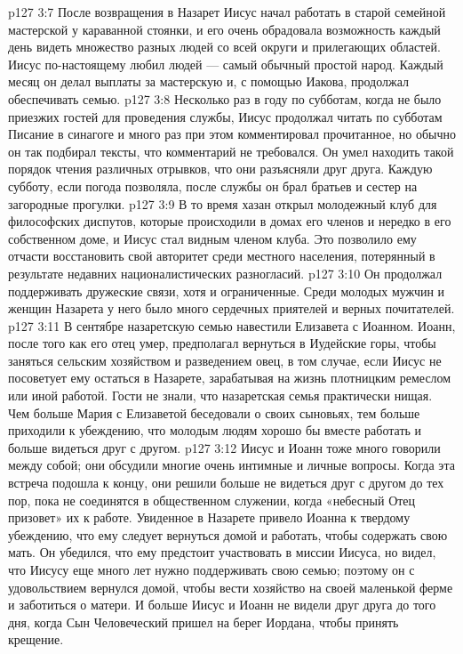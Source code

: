 \vs p127 3:7 \pc После возвращения в Назарет Иисус начал работать в старой семейной мастерской у караванной стоянки, и его очень обрадовала возможность каждый день видеть множество разных людей со всей округи и прилегающих областей. Иисус по\hyp{}настоящему любил людей --- самый обычный простой народ. Каждый месяц он делал выплаты за мастерскую и, с помощью Иакова, продолжал обеспечивать семью.
\vs p127 3:8 Несколько раз в году по субботам, когда не было приезжих гостей для проведения службы, Иисус продолжал читать по субботам Писание в синагоге и много раз при этом комментировал прочитанное, но обычно он так подбирал тексты, что комментарий не требовался. Он умел находить такой порядок чтения различных отрывков, что они разъясняли друг друга. Каждую субботу, если погода позволяла, после службы он брал братьев и сестер на загородные прогулки.
\vs p127 3:9 В то время хазан открыл молодежный клуб для философских диспутов, которые происходили в домах его членов и нередко в его собственном доме, и Иисус стал видным членом клуба. Это позволило ему отчасти восстановить свой авторитет среди местного населения, потерянный в результате недавних националистических разногласий.
\vs p127 3:10 Он продолжал поддерживать дружеские связи, хотя и ограниченные. Среди молодых мужчин и женщин Назарета у него было много сердечных приятелей и верных почитателей.
\vs p127 3:11 \pc В сентябре назаретскую семью навестили Елизавета с Иоанном. Иоанн, после того как его отец умер, предполагал вернуться в Иудейские горы, чтобы заняться сельским хозяйством и разведением овец, в том случае, если Иисус не посоветует ему остаться в Назарете, зарабатывая на жизнь плотницким ремеслом или иной работой. Гости не знали, что назаретская семья практически нищая. Чем больше Мария с Елизаветой беседовали о своих сыновьях, тем больше приходили к убеждению, что молодым людям хорошо бы вместе работать и больше видеться друг с другом.
\vs p127 3:12 Иисус и Иоанн тоже много говорили между собой; они обсудили многие очень интимные и личные вопросы. Когда эта встреча подошла к концу, они решили больше не видеться друг с другом до тех пор, пока не соединятся в общественном служении, когда «небесный Отец призовет» их к работе. Увиденное в Назарете привело Иоанна к твердому убеждению, что ему следует вернуться домой и работать, чтобы содержать свою мать. Он убедился, что ему предстоит участвовать в миссии Иисуса, но видел, что Иисусу еще много лет нужно поддерживать свою семью; поэтому он с удовольствием вернулся домой, чтобы вести хозяйство на своей маленькой ферме и заботиться о матери. И больше Иисус и Иоанн не видели друг друга до того дня, когда Сын Человеческий пришел на берег Иордана, чтобы принять крещение.
